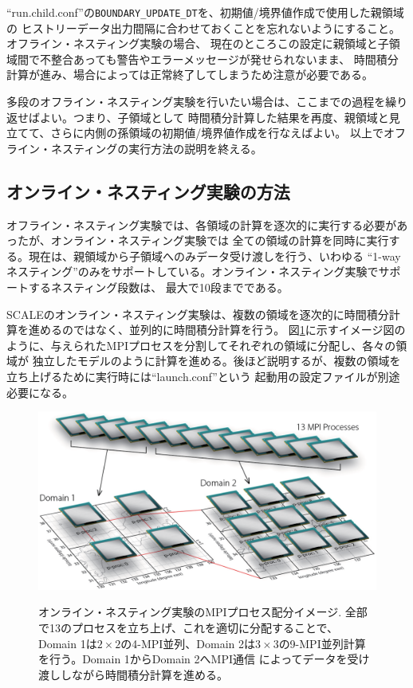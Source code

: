 \noindent ``run.child.conf''の\verb|BOUNDARY_UPDATE_DT|を、初期値/境界値作成で使用した親領域の
ヒストリーデータ出力間隔に合わせておくことを忘れないようにすること。オフライン・ネスティング実験の場合、
現在のところこの設定に親領域と子領域間で不整合あっても警告やエラーメッセージが発せられないまま、
時間積分計算が進み、場合によっては正常終了してしまうため注意が必要である。

多段のオフライン・ネスティング実験を行いたい場合は、ここまでの過程を繰り返せばよい。つまり、子領域として
時間積分計算した結果を再度、親領域と見立てて、さらに内側の孫領域の初期値/境界値作成を行なえばよい。
以上でオフライン・ネスティングの実行方法の説明を終える。


\subsection{オンライン・ネスティング実験の方法} \label{sec:nest_online}

オフライン・ネスティング実験では、各領域の計算を逐次的に実行する必要があったが、オンライン・ネスティング実験では
全ての領域の計算を同時に実行する。現在は、親領域から子領域へのみデータ受け渡しを行う、いわゆる
``1-wayネスティング''のみをサポートしている。オンライン・ネスティング実験でサポートするネスティング段数は、
最大で10段までである。

SCALEのオンライン・ネスティング実験は、複数の領域を逐次的に時間積分計算を進めるのではなく、並列的に時間積分計算を行う。
図\ref{fig_mpisplit}に示すイメージ図のように、与えられたMPIプロセスを分割してそれぞれの領域に分配し、各々の領域が
独立したモデルのように計算を進める。後ほど説明するが、複数の領域を立ち上げるために実行時には``launch.conf''という
起動用の設定ファイルが別途必要になる。

\begin{figure}[t]
\begin{center}
  \includegraphics[width=0.8\hsize]{./figure/mpisplit_nesting.eps}\\
  \caption{オンライン・ネスティング実験のMPIプロセス配分イメージ. 全部で13のプロセスを立ち上げ、これを適切に分配することで、
           Domain 1は$2 \times 2$の4-MPI並列、Domain 2は$3 \times 3$の9-MPI並列計算を行う。Domain 1からDomain 2へMPI通信
           によってデータを受け渡ししながら時間積分計算を進める。}
  \label{fig_mpisplit}
\end{center}
\end{figure}


